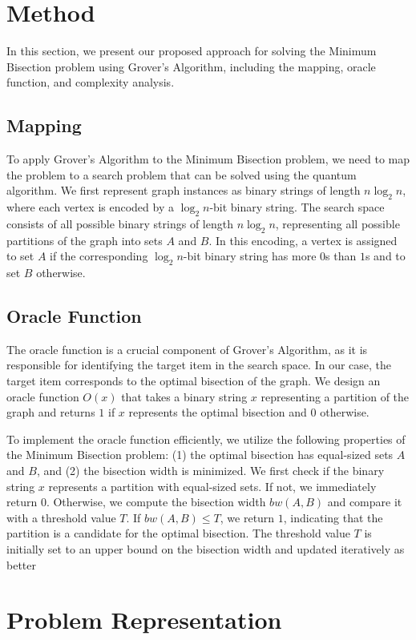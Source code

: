 \section{Method}
\label{sec:method}
In this section, we present our proposed approach for solving the Minimum Bisection problem using Grover's Algorithm, including the mapping, oracle function, and complexity analysis.

\subsection{Mapping}
To apply Grover's Algorithm to the Minimum Bisection problem, we need to map the problem to a search problem that can be solved using the quantum algorithm. We first represent graph instances as binary strings of length $n \log_2 n$, where each vertex is encoded by a $\log_2 n$-bit binary string. The search space consists of all possible binary strings of length $n \log_2 n$, representing all possible partitions of the graph into sets $A$ and $B$. In this encoding, a vertex is assigned to set $A$ if the corresponding $\log_2 n$-bit binary string has more $0$s than $1$s and to set $B$ otherwise.

\subsection{Oracle Function}
The oracle function is a crucial component of Grover's Algorithm, as it is responsible for identifying the target item in the search space. In our case, the target item corresponds to the optimal bisection of the graph. We design an oracle function $O(x)$ that takes a binary string $x$ representing a partition of the graph and returns $1$ if $x$ represents the optimal bisection and $0$ otherwise.

To implement the oracle function efficiently, we utilize the following properties of the Minimum Bisection problem: (1) the optimal bisection has equal-sized sets $A$ and $B$, and (2) the bisection width is minimized. We first check if the binary string $x$ represents a partition with equal-sized sets. If not, we immediately return $0$. Otherwise, we compute the bisection width $bw(A, B)$ and compare it with a threshold value $T$. If $bw(A, B) \leq T$, we return $1$, indicating that the partition is a candidate for the optimal bisection. The threshold value $T$ is initially set to an upper bound on the bisection width and updated iteratively as better

\section{Problem Representation}

